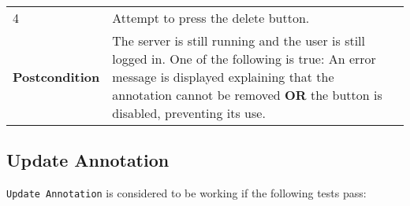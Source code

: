 \begin{longtable}[c]{@{}ll@{}}
\begin{minipage}[t]{0.31\columnwidth}\raggedright\strut
4
\strut\end{minipage} &
\begin{minipage}[t]{0.63\columnwidth}\raggedright\strut
Attempt to press the delete button.
\strut\end{minipage}\tabularnewline
\begin{minipage}[t]{0.31\columnwidth}\raggedright\strut
\textbf{Postcondition}
\strut\end{minipage} &
\begin{minipage}[t]{0.63\columnwidth}\raggedright\strut
The server is still running and the user is still logged in. One of the
following is true: An error message is displayed explaining that the
annotation cannot be removed \textbf{OR} the button is disabled,
preventing its use.
\strut\end{minipage}\tabularnewline
\bottomrule
\end{longtable}

\pagebreak

\subsection{Update Annotation}\label{update-annotation}

\texttt{Update\ Annotation} is considered to be working if the following
tests pass:

